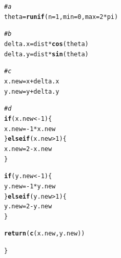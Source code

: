 \documentclass{article}\usepackage[]{graphicx}\usepackage[]{xcolor}
\makeatletter
\newcommand{\hlnum}[1]{\textcolor[rgb]{0.686,0.059,0.569}{#1}}%
\newcommand{\hlcom}[1]{\textcolor[rgb]{0.678,0.584,0.686}{\textit{#1}}}%
\newcommand{\hlopt}[1]{\textcolor[rgb]{0,0,0}{#1}}%
\newcommand{\hldef}[1]{\textcolor[rgb]{0.345,0.345,0.345}{#1}}%
\newcommand{\hlkwa}[1]{\textcolor[rgb]{0.161,0.373,0.58}{\textbf{#1}}}%
\newcommand{\hlkwb}[1]{\textcolor[rgb]{0.69,0.353,0.396}{#1}}%
\newcommand{\hlkwc}[1]{\textcolor[rgb]{0.333,0.667,0.333}{#1}}%
\newcommand{\hlkwd}[1]{\textcolor[rgb]{0.737,0.353,0.396}{\textbf{#1}}}%
\newenvironment{kframe}{%
 \def\at@end@of@kframe{}%
 \ifinner\ifhmode%
  \def\at@end@of@kframe{\end{minipage}}%
  \begin{minipage}{\columnwidth}%
 \fi\fi%
 \def\FrameCommand##1{\hskip\@totalleftmargin \hskip-\fboxsep
 \colorbox{shadecolor}{##1}\hskip-\fboxsep
     \hskip-\linewidth \hskip-\@totalleftmargin \hskip\columnwidth}%
 \MakeFramed {\advance\hsize-\width
   \@totalleftmargin\z@ \linewidth\hsize
   \@setminipage}}%
 {\par\unskip\endMakeFramed%
 \at@end@of@kframe}
\newenvironment{knitrout}{}{} %
\makeatother
\begin{document}
\begin{enumerate}
\begin{knitrout}
\begin{kframe}
\begin{alltt}
  \hlcom{#a}
  \hldef{theta} \hlkwb{=} \hlkwd{runif}\hldef{(}\hlkwc{n} \hldef{=} \hlnum{1}\hldef{,} \hlkwc{min} \hldef{=} \hlnum{0}\hldef{,} \hlkwc{max} \hldef{=} \hlnum{2}\hlopt{*}\hldef{pi)}

  \hlcom{#b}
  \hldef{delta.x} \hlkwb{=} \hldef{dist} \hlopt{*} \hlkwd{cos}\hldef{(theta)}
  \hldef{delta.y} \hlkwb{=} \hldef{dist} \hlopt{*} \hlkwd{sin}\hldef{(theta)}

  \hlcom{#c}
  \hldef{x.new} \hlkwb{=} \hldef{x} \hlopt{+} \hldef{delta.x}
  \hldef{y.new} \hlkwb{=} \hldef{y} \hlopt{+} \hldef{delta.y}

  \hlcom{#d}
  \hlkwa{if}\hldef{(x.new} \hlopt{< -}\hlnum{1}\hldef{)\{}
    \hldef{x.new} \hlkwb{=} \hlopt{-}\hlnum{1} \hlopt{*} \hldef{x.new}
  \hldef{\}} \hlkwa{else if} \hldef{(x.new} \hlopt{>} \hlnum{1}\hldef{)\{}
    \hldef{x.new} \hlkwb{=} \hlnum{2} \hlopt{-} \hldef{x.new}
  \hldef{\}}

  \hlkwa{if}\hldef{(y.new} \hlopt{< -}\hlnum{1}\hldef{)\{}
    \hldef{y.new} \hlkwb{=} \hlopt{-}\hlnum{1} \hlopt{*} \hldef{y.new}
  \hldef{\}} \hlkwa{else if} \hldef{(y.new} \hlopt{>} \hlnum{1}\hldef{)\{}
    \hldef{y.new} \hlkwb{=} \hlnum{2} \hlopt{-} \hldef{y.new}
  \hldef{\}}

  \hlkwd{return}\hldef{(}\hlkwd{c}\hldef{(x.new, y.new))}

\hldef{\}}
\end{alltt}
\end{kframe}
\end{knitrout}


\end{enumerate}
\end{document}
